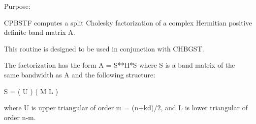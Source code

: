  \begin{DoxyParagraph}{Purpose\+: }
\begin{DoxyVerb} CPBSTF computes a split Cholesky factorization of a complex
 Hermitian positive definite band matrix A.

 This routine is designed to be used in conjunction with CHBGST.

 The factorization has the form  A = S**H*S  where S is a band matrix
 of the same bandwidth as A and the following structure:

   S = ( U    )
       ( M  L )

 where U is upper triangular of order m = (n+kd)/2, and L is lower
 triangular of order n-m.\end{DoxyVerb}
 
\end{DoxyParagraph}

